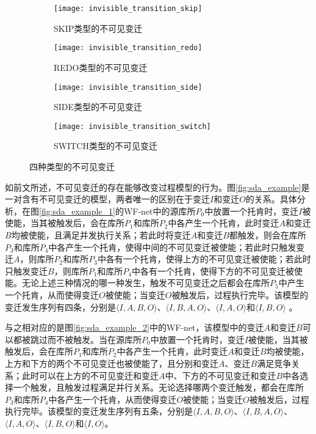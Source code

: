 \begin{figure}[htbp]
  \centering
  \begin{subfigure}[b]{0.48\textwidth}
    \centering
    \texttt{[image: invisible\_transition\_skip]}
    \caption{SKIP类型的不可见变迁}
    \label{fig:invisible_transition_skip}
  \end{subfigure}
  \begin{subfigure}[b]{0.48\textwidth}
    \centering
    \texttt{[image: invisible\_transition\_redo]}
    \caption{REDO类型的不可见变迁}
    \label{fig:invisible_transition_redo}
  \end{subfigure}
  \begin{subfigure}[b]{0.48\textwidth}
    \vspace{1em}
    \centering
    \texttt{[image: invisible\_transition\_side]}
    \caption{SIDE类型的不可见变迁}
    \label{fig:invisible_transition_side}
  \end{subfigure}
  \begin{subfigure}[b]{0.48\textwidth}
    \vspace{1em}
    \centering
    \texttt{[image: invisible\_transition\_switch]}
    \caption{SWITCH类型的不可见变迁}
    \label{fig:invisible_transition_switch}
  \end{subfigure}
  \vspace{6pt}
  \caption{四种类型的不可见变迁}
  \label{fig:invisible_transition_types}
\end{figure}

如前文所述，不可见变迁的存在能够改变过程模型的行为。图\ref{fig:sda_example}是一对含有不可见变迁的模型，两者唯一的区别在于变迁$I$和变迁$O$的关系。具体分析，在图\ref{fig:sda_example_1}的WF-net中的源库所$P_{0}$中放置一个托肯时，变迁$I$被使能，当其被触发后，会在库所$P_{1}$和库所$P_{2}$中各产生一个托肯，此时变迁$A$和变迁$B$均被使能，且满足并发执行关系；若此时将变迁$A$和变迁$B$都触发，则会在库所$P_{3}$和库所$P_{4}$中各产生一个托肯，使得中间的不可见变迁被使能；若此时只触发变迁$A$，则库所$P_{2}$和库所$P_{3}$中各有一个托肯，使得上方的不可见变迁被使能；若此时只触发变迁$B$，则库所$P_{1}$和库所$P_{4}$中各有一个托肯，使得下方的不可见变迁被使能。无论上述三种情况的哪一种发生，触发不可见变迁之后都会在库所$P_{5}$中产生一个托肯，从而使得变迁$O$被使能；当变迁$O$被触发后，过程执行完毕。该模型的变迁发生序列有四条，分别是$\langle I,A,B,O\rangle$、$\langle I,B,A,O\rangle$、$\langle I,A,O\rangle$和$\langle I,B,O\rangle$
。

与之相对应的是图\ref{fig:sda_example_2}中的WF-net，该模型中的变迁$A$和变迁$B$可以都被跳过而不被触发。当在源库所$P_{0}$中放置一个托肯时，变迁$I$被使能，当其被触发后，会在库所$P_{1}$和库所$P_{2}$中各产生一个托肯，此时变迁$A$和变迁$B$均被使能，上方和下方的两个不可见变迁也被使能了，且分别和变迁$A$、变迁$B$满足竞争关系；此时可以在上方的不可见变迁和变迁$A$中、下方的不可见变迁和变迁$B$中各选择一个触发，且触发过程满足并行关系。无论选择哪两个变迁触发，都会在库所$P_{3}$和库所$P_{4}$中各产生一个托肯，从而使得变迁$O$被使能；当变迁$O$被触发后，过程执行完毕。该模型的变迁发生序列有五条，分别是$\langle I,A,B,O\rangle$、$\langle I,B,A,O\rangle$、$\langle I,A,O\rangle$、$\langle I,B,O\rangle$和$\langle I,O\rangle$。

